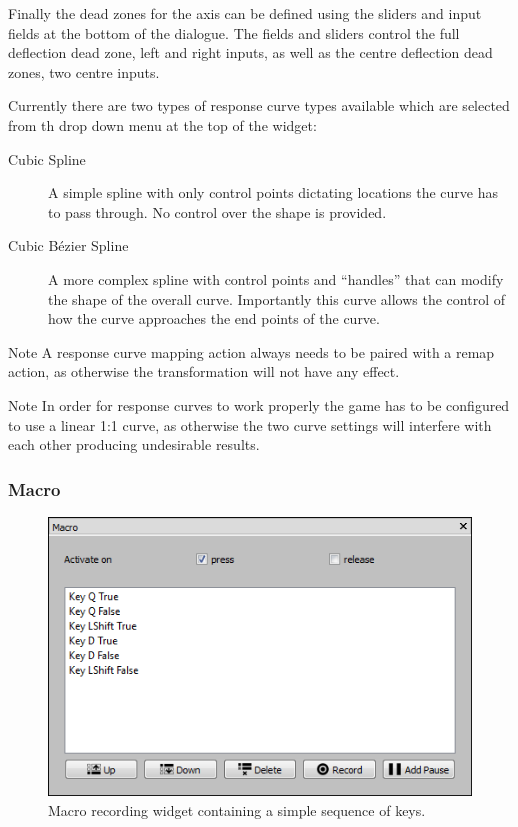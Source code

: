 \documentclass[a4, 10pt]{article}
\begin{document}
Finally the dead zones for the axis can be defined using the sliders and
input fields at the bottom of the dialogue. The fields and sliders
control the full deflection dead zone, left and right inputs, as well as
the centre deflection dead zones, two centre inputs.

Currently there are two types of response curve types available which
are selected from th drop down menu at the top of the widget:
\begin{description}
    \item[Cubic Spline] A simple spline with only control points dictating
        locations the curve has to pass through. No control over the
        shape is provided.
    \item[Cubic B\'{e}zier Spline] A more complex spline with control
        points and ``handles'' that can modify the shape of the overall
        curve. Importantly this curve allows the control of how the
        curve approaches the end points of the curve.
\end{description}

\begin{bclogo}[
    couleur=yellow!40,
    couleurBord=orange!80,
    couleurBarre=orange!80,
    arrondi=0.1,
    logo=\bcinfo
]{Note}
    A response curve mapping action always needs to be paired with a
    remap action, as otherwise the transformation will not have any
    effect.
\end{bclogo}

\vspace{1em}

\begin{bclogo}[
    couleur=yellow!40,
    couleurBord=orange!80,
    couleurBarre=orange!80,
    arrondi=0.1,
    logo=\bcinfo
]{Note}
    In order for response curves to work properly the game has to be
    configured to use a linear 1:1 curve, as otherwise the two curve
    settings will interfere with each other producing undesirable
    results.
\end{bclogo}


\subsubsection{Macro}

\begin{figure}[bt]
    \centering

    \includegraphics[width=0.75\linewidth]{images/action_macro}
    \caption{Macro recording widget containing a simple sequence of
    keys.}
    \label{fig:action_macro}
\end{figure}
\end{document}
